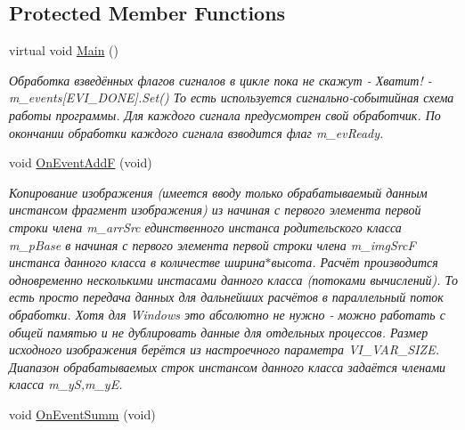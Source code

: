 \subsection*{Protected Member Functions}
\begin{DoxyCompactItemize}
\item 
virtual void \hyperlink{class_c_v_i_engine_thread_a24ed1bd13eea28048ed010e65697e578}{Main} ()
\begin{DoxyCompactList}\small\item\em Обработка взведённых флагов сигналов в цикле пока не скажут -\/ Хватит! -\/ m\+\_\+events\mbox{[}E\+V\+I\+\_\+\+D\+O\+N\+E\mbox{]}.Set() То есть используется сигнально-\/событийная схема работы программы. Для каждого сигнала предусмотрен свой обработчик. По окончании обработки каждого сигнала взводится флаг m\+\_\+ev\+Ready. \end{DoxyCompactList}\item 
void \hyperlink{class_c_v_i_engine_thread_aa9882f7bd24457ef387daf9b878d9e36}{On\+Event\+Add\+F} (void)
\begin{DoxyCompactList}\small\item\em Копирование изображения (имеется вводу только обрабатываемый данным инстансом фрагмент изображения) из начиная с первого элемента первой строки члена m\+\_\+arr\+Src единственного инстанса родительского класса m\+\_\+p\+Base в начиная с первого элемента первой строки члена m\+\_\+img\+Src\+F инстанса данного класса в количестве ширина$\ast$высота. Расчёт производится одновременно несколькими инстасами данного класса (потоками вычислений). То есть просто передача данных для дальнейших расчётов в параллельный поток обработки. Хотя для Windows это абсолютно не нужно -\/ можно работать с общей памятью и не дублировать данные для отдельных процессов. Размер исходного изображения берётся из настроечного параметра V\+I\+\_\+\+V\+A\+R\+\_\+\+S\+I\+Z\+E. Диапазон обрабатываемых строк инстансом данного класса задаётся членами класса m\+\_\+y\+S,m\+\_\+y\+E. \end{DoxyCompactList}\item 
void \hyperlink{class_c_v_i_engine_thread_ac41086d9d426c39ce9a5ab78bdff6f8d}{On\+Event\+Summ} (void)

\end{DoxyCompactItemize}
